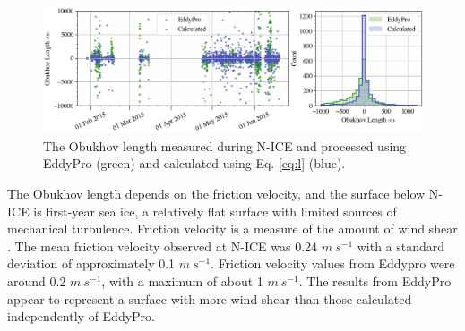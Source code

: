 \begin{figure}[b!]
    \centering
    \includegraphics[width=1\linewidth]{figures/chapter5/ch3_obukhovlength.png}
    \caption[Obukhov length]{The Obukhov length measured during N-ICE and processed using EddyPro (green) and calculated using Eq. \ref{eq:l} (blue).}
    \label{fig:ol}
\end{figure}

The Obukhov length depends on the friction velocity, and the surface below N-ICE is first-year sea ice, a relatively flat surface with limited sources of mechanical turbulence. Friction velocity is a measure of the amount of wind shear \citep{stull:1988}. The mean friction velocity observed at N-ICE was 0.24 $m~s^{-1}$ with a standard deviation of approximately 0.1 $m~s^{-1}$. Friction velocity values from Eddypro were around 0.2 $m~s^{-1}$, with a maximum of about 1 $m~s^{-1}$. The results from EddyPro appear to represent a surface with more wind shear than those calculated independently of EddyPro. 

